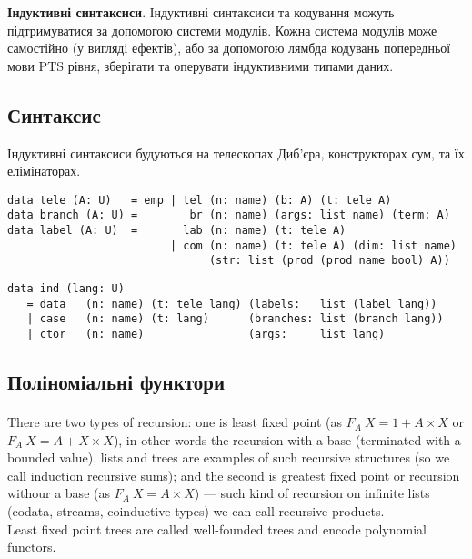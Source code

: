 \begin{definition}
\begin{definition}
\begin{definition}
\begin{definition}
{\bf Індуктивні синтаксиси}. Індуктивні синтаксиси та кодування можуть підтримуватися за допомогою системи модулів.
Кожна система модулів може самостійно (у вигляді ефектів), або за допомогою лямбда кодувань
попередньої мови PTS рівня, зберігати та оперувати індуктивними типами даних.

\subsection{Синтаксис}

Індуктивні синтаксиси будуються на телескопах Диб'єра,
конструкторах сум, та їх елімінаторах.

\begin{lstlisting}
data tele (A: U)   = emp | tel (n: name) (b: A) (t: tele A)
data branch (A: U) =        br (n: name) (args: list name) (term: A)
data label (A: U)  =       lab (n: name) (t: tele A)
                         | com (n: name) (t: tele A) (dim: list name)
                               (str: list (prod (prod name bool) A))
\end{lstlisting}

\begin{lstlisting}
data ind (lang: U)
   = data_  (n: name) (t: tele lang) (labels:   list (label lang))
   | case   (n: name) (t: lang)      (branches: list (branch lang))
   | ctor   (n: name)                (args:     list lang)
\end{lstlisting}

  \subsection{Поліноміальні функтори}

  \paragraph{}
  There are two types of recursion: one is least fixed point (as $F_A\ X = 1 + A\times X$
  or $F_A\ X = A + X\times X$), in other words the recursion with a base (terminated with a bounded value),
  lists and trees are examples of such recursive structures (so we call induction recursive sums);
  and the second is greatest fixed point or recursion withour a base (as $F_A\ X = A\times X $) ---
  such kind of recursion on infinite lists (codata, streams, coinductive types) we can call recursive products.\\
  Least fixed point trees are called well-founded trees and encode polynomial functors.


\end{definition}
\end{definition}
\end{definition}
\end{definition}

